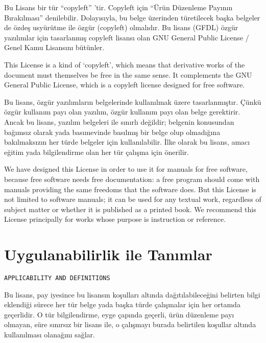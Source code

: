 \begin{multicols}{2}
Bu Lisans bir tür “copyleft” 'tir. Copyleft için ``Ürün Düzenleme Payının Bırakılması'' denilebilir. Dolayısıyla, bu belge üzerinden türetilecek başka belgeler de özdeş usyürütme ile özgür (copyleft) olmalıdır. Bu lisans (GFDL) özgür yazılımlar için tasarlanmış copyleft  lisansı olan GNU General Public License / Genel Kamu Lisansını bütünler.

\begin{ingliz}
This License is a kind of `copyleft', which
means that derivative works of the document must themselves be
free in the same sense.  It complements the GNU General Public
License, which is a copyleft license designed for free
software.
\end{ingliz}

Bu lisans, özgür yazılımların belgelerinde kullanılmak üzere tasarlanmıştır. Çünkü özgür kullanım payı olan yazılım, özgür kullanım payı olan belge gerektirir. Ancak bu lisans, yazılım belgeleri ile sınırlı değildir; belgenin konusundan bağımsız olarak yada basımevinde basılmış bir belge olup olmadığına bakılmaksızın her türde belgeler için kullanılabilir. İlke olarak bu lisans, amacı eğitim yada bilgilendirme olan her tür çalışma için önerilir.

\begin{ingliz}
We have designed this License in order to use it for
manuals for free software, because free software needs free
documentation: a free program should come with manuals
providing the same freedoms that the software does.  But this
License is not limited to software manuals; it can be used for
any textual work, regardless of subject matter or whether it
is published as a printed book.  We recommend this License
principally for works whose purpose is instruction or
reference.
\end{ingliz}

\section{Uygulanabilirlik ile Tanımlar}\hfill\begin{verbatim}APPLICABILITY AND DEFINITIONS\end{verbatim}%
Bu lisans, pay iyesince bu lisansın koşulları
altında dağıtılabileceğini belirten bilgi eklendiği sürece her tür belge yada başka türde çalışmalar için her ortamda geçerlidir. O tür bilgilendirme, eyge çapında geçerli, ürün düzenleme payı olmayan, süre sınırsız bir lisans ile, o çalışmayı burada belirtilen koşullar altında kullanılması olanağını sağlar.


\end{multicols}
